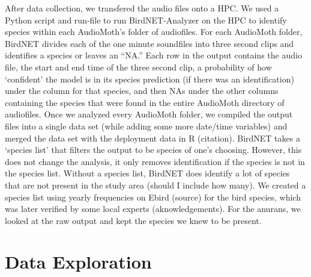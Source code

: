 \documentclass[
  letterpaper,
  DIV=11,
  numbers=noendperiod]{scrartcl}
\begin{document}
After data collection, we transfered the audio files onto a HPC. We used
a Python script and run-file to run BirdNET-Analyzer on the HPC to
identify species within each AudioMoth's folder of audiofiles. For each
AudioMoth folder, BirdNET divides each of the one minute soundfiles into
three second clips and identifies a species or leaves an ``NA.'' Each
row in the output contains the audio file, the start and end time of the
three second clip, a probability of how `confident' the model is in its
species prediction (if there was an identification) under the column for
that species, and then NAs under the other columns containing the
species that were found in the entire AudioMoth directory of audiofiles.
Once we analyzed every AudioMoth folder, we compiled the output files
into a single data set (while adding some more date/time variables) and
merged the data set with the deployment data in R (citation). BirdNET
takes a `species list' that filters the output to be species of one's
choosing. However, this does not change the analysis, it only removes
identification if the species is not in the species list. Without a
species list, BirdNET does identify a lot of species that are not
present in the study area (should I include how many). We created a
species list using yearly frequencies on Ebird (source) for the bird
species, which was later verified by some local experts
(aknowledgements). For the anurans, we looked at the raw output and kept
the species we knew to be present.

\section{Data Exploration}\label{data-exploration}

\linespread{0.9}
\end{document}
